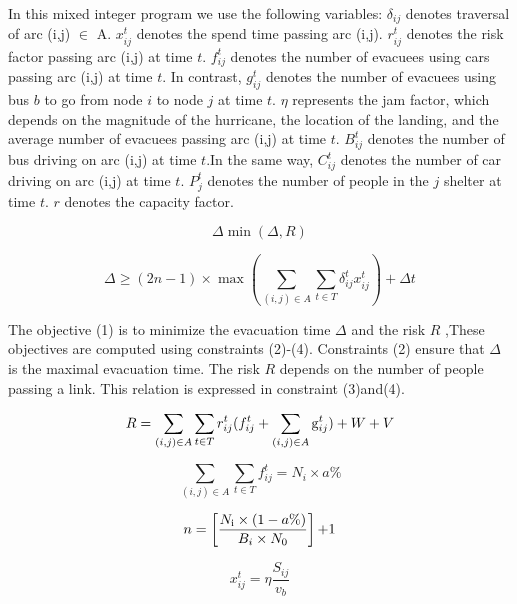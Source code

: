 \documentclass{mcmthesis}
\begin{document}
In this mixed integer program we use the following variables: $\delta _{ij}$ denotes traversal of arc (i,j) $ \in $ A. $x_{ij}^t$ denotes the spend time passing arc (i,j). $r_{ij}^t$ denotes the risk factor passing arc (i,j) at time $t$. $f_{ij}^t$ denotes the number of evacuees using cars passing arc (i,j) at time $t$. In contrast, $g_{ij}^t$ denotes the number of evacuees using bus $b$ to go from node $i$ to node $j$ at time $t$. $\eta $ represents the jam factor, which depends on the magnitude of the hurricane, the location of the landing, and the average number of evacuees passing arc (i,j) at time $t$. $B_{ij}^t$ denotes the number of bus driving on arc (i,j) at time $t$.In the same way, $C_{ij}^t$ denotes the number of car driving on arc (i,j) at time $t$. $P_j^t$  denotes the number of people in the $j$ shelter at time $t$. $r$ denotes the capacity factor.


\begin{equation}\label{3}
\Delta \min (\Delta ,R)
\end{equation}

\begin{equation}\label{4}
\Delta  \ge (2n - 1) \times \max (\sum\limits_{(i,j) \in A} {\sum\limits_{t \in T} {\delta _{ij}^tx_{ij}^t} } ) + \Delta t
\end{equation}

The objective (1) is to minimize the evacuation time $\Delta $ and the risk $R$ ,These objectives are computed using constraints (2)-(4). Constraints (2) ensure that $\Delta $ is the maximal evacuation time. The risk $R$ depends on the number of people passing a link. This relation is expressed in constraint (3)and(4).

\begin{equation}\label{5}
 R = \sum\limits_{(i,j) \in A} {\sum\limits_{t \in T} {r_{ij}^t} } (f_{ij}^t + \sum\limits_{(i,j) \in A} {{\rm{g}}_{ij}^t} ) + W + V
\end{equation}

\begin{equation}\label{6}
\sum\limits_{(i,j) \in A} {\sum\limits_{t \in T} {f_{ij}^t} }  = {N_i} \times a\%
\end{equation}

\begin{equation}\label{7}
n = \left[ {\frac{{{N_{\rm{i}}} \times (1 - a\% )}}{{{B_i} \times {N_0}}}} \right]{\rm{ + }}1
\end{equation}

\begin{equation}\label{8}
x_{ij}^t = \eta \frac{{{S_{ij}}}}{{{v_b}}}
\end{equation}
\end{document}

